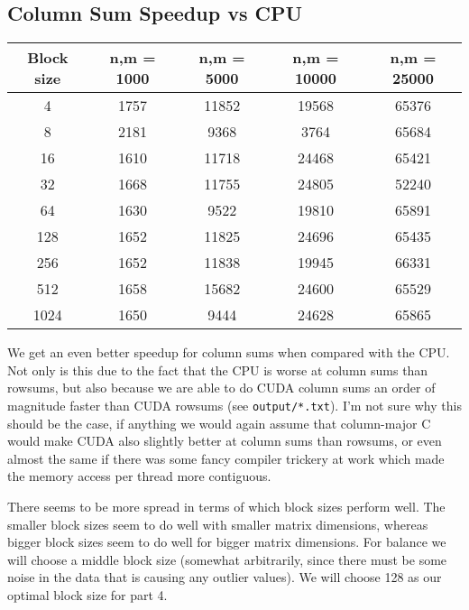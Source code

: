 \documentclass[a4paper, fleqn]{article}
\begin{document}
\subsection{Column Sum Speedup vs CPU}%
\begin{center}
 \begin{tabular}{||c | c | c | c | c ||}
 \hline
 Block size & n,m = 1000 & n,m = 5000 & n,m = 10000 & n,m = 25000 \\ [0.5ex] 
 \hline
 4 & 1757 & 11852 & 19568 & 65376 \\
 \hline
 8 & 2181 & 9368 & 3764 & 65684 \\
 \hline
 16 & 1610 & 11718 & 24468 & 65421 \\
 \hline
 32 & 1668 & 11755 & 24805 & 52240 \\
 \hline
 64 & 1630 & 9522 & 19810 & 65891 \\
 \hline
 128 & 1652 & 11825 & 24696 & 65435 \\
 \hline
 256 & 1652 & 11838 & 19945 & 66331 \\
 \hline
 512 & 1658 & 15682 & 24600 & 65529 \\
 \hline
 1024 & 1650 & 9444 & 24628 & 65865 \\
 \hline
 \hline
\end{tabular}
\end{center}
We get an even better speedup for column sums when compared with the CPU. Not only is this due to the fact that the CPU is worse at column sums than rowsums, but also because we are able to do CUDA column sums an order of magnitude faster than CUDA rowsums (see \texttt{output/*.txt}). I'm not sure why this should be the case, if anything we would again assume that column-major C would make CUDA also slightly better at column sums than rowsums, or even almost the same if there was some fancy compiler trickery at work which made the memory access per thread more contiguous. 

There seems to be more spread in terms of which block sizes perform well. The smaller block sizes seem to do well with smaller matrix dimensions, whereas bigger block sizes seem to do well for bigger matrix dimensions. For balance we will choose a middle block size (somewhat arbitrarily, since there must be some noise in the data that is causing any outlier values). We will choose 128 as our optimal block size for part 4.
\end{document}
